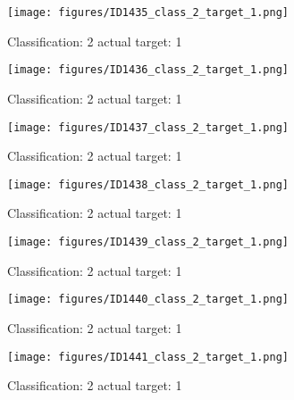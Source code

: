 \begin{figure}[h!]
\begin{center}
\texttt{[image: figures/ID1435\_class\_2\_target\_1.png]}
\end{center}
\caption{ Classification: 2 actual target: 1}
\label{fig:ID1435_class_2_target_1}
\end{figure}
\begin{figure}[h!]
\begin{center}
\texttt{[image: figures/ID1436\_class\_2\_target\_1.png]}
\end{center}
\caption{ Classification: 2 actual target: 1}
\label{fig:ID1436_class_2_target_1}
\end{figure}
\begin{figure}[h!]
\begin{center}
\texttt{[image: figures/ID1437\_class\_2\_target\_1.png]}
\end{center}
\caption{ Classification: 2 actual target: 1}
\label{fig:ID1437_class_2_target_1}
\end{figure}
\begin{figure}[h!]
\begin{center}
\texttt{[image: figures/ID1438\_class\_2\_target\_1.png]}
\end{center}
\caption{ Classification: 2 actual target: 1}
\label{fig:ID1438_class_2_target_1}
\end{figure}
\begin{figure}[h!]
\begin{center}
\texttt{[image: figures/ID1439\_class\_2\_target\_1.png]}
\end{center}
\caption{ Classification: 2 actual target: 1}
\label{fig:ID1439_class_2_target_1}
\end{figure}
\begin{figure}[h!]
\begin{center}
\texttt{[image: figures/ID1440\_class\_2\_target\_1.png]}
\end{center}
\caption{ Classification: 2 actual target: 1}
\label{fig:ID1440_class_2_target_1}
\end{figure}
\begin{figure}[h!]
\begin{center}
\texttt{[image: figures/ID1441\_class\_2\_target\_1.png]}
\end{center}
\caption{ Classification: 2 actual target: 1}
\label{fig:ID1441_class_2_target_1}
\end{figure}

